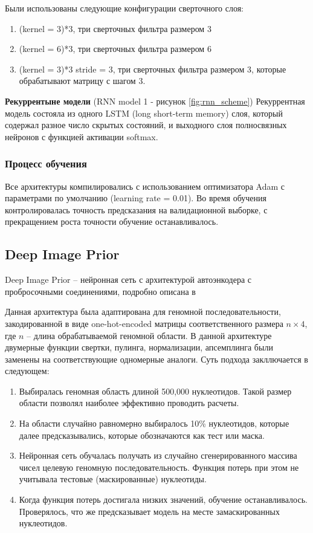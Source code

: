 Были использованы следующие конфигурации сверточного слоя: \begin{enumerate}
		\item (kernel = 3)*3, три сверточных фильтра размером 3
		\item (kernel = 6)*3, три сверточных фильтра размером 6
		\item (kernel = 3)*3 stride = 3, три сверточных фильтра размером 3, которые обрабатывают матрицу с шагом 3.
	\end{enumerate}
 
{\bfseries Рекуррентыне модели } (RNN model 1 - рисунок \ref{fig:rnn_scheme}) Рекуррентная модель состояла из одного LSTM (long short-term memory) слоя, который содержал разное число скрытых состояний, и выходного слоя полносвязных нейронов с функцией активации softmax. 


\subsubsection{Процесс обучения}
Все архитектуры компилировались с использованием оптимизатора Adam \cite{kingma_adam:_2014} с параметрами по умолчанию (learning rate = 0.01). Во время обучения контролировалась точность предсказания на валидационной выборке, с прекращением роста точности обучение останавливалось.


\subsection{Deep Image Prior}
Deep Image Prior --  нейронная сеть с архитектурой автоэнкодера с пробросочными соединениями, подробно описана в \cite{ulyanov_deep_2018}

Данная архитектура была адаптирована для геномной последовательности, закодированной в виде one-hot-encoded матрицы соответственного размера $n\times 4$, где $n$ – длина обрабатываемой геномной области.
В данной архитектуре двумерные функции свертки, пулинга, нормализации, апсемплинга были заменены на соответствующие одномерные аналоги.
Суть подхода закллючается в следующем:

\begin{enumerate}
	\item Выбиралась геномная область длиной 500,000 нуклеотидов. Такой размер области позволял наиболее эффективно проводить расчеты.
	\item На области случайно равномерно выбиралось  10\% нуклеотидов, которые далее предсказывались, которые обозначаются как тест или маска.
	\item Нейронная сеть обучалась получать из случайно сгенерированного массива чисел целевую геномную последовательность. Функция потерь при этом не учитывала тестовые (маскированные) нуклеотиды.
	\item Когда функция потерь достигала низких значений, обучение останавливалось. Проверялось, что же предсказывает модель на месте замаскированных нуклеотидов.
\end{enumerate} 



